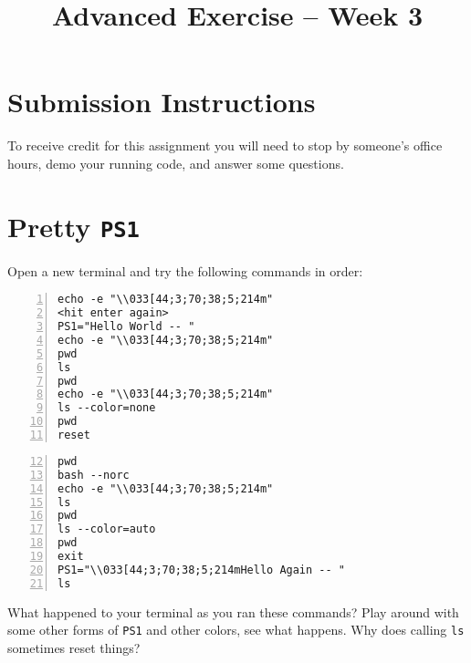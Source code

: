 \documentclass{article}
\begin{document}
\fancyfoot[C]{\color{gray} \thepage~/~\pageref*{LastPage}}
\pagestyle{fancyplain}


\title{\textbf{Advanced Exercise -- Week 3\\}}
\author{\textbf{\color{red}{Due: Before October 8, 10:00PM}}}
\date{}
\maketitle

\section*{Submission Instructions}
To receive credit for this assignment you will need to stop by someone's
office hours, demo your running code, and answer some questions.

\section{Pretty \texttt{PS1}}

Open a new terminal and try the following commands in order:

\begin{minipage}[t]{0.5\textwidth}
\begin{lstlisting}[numbers=left]
echo -e "\\033[44;3;70;38;5;214m"
<hit enter again>
PS1="Hello World -- "
echo -e "\\033[44;3;70;38;5;214m"
pwd
ls
pwd
echo -e "\\033[44;3;70;38;5;214m"
ls --color=none
pwd
reset
\end{lstlisting}
\end{minipage}
\begin{minipage}[t]{0.5\textwidth}
  \begin{lstlisting}[numbers=left,firstnumber=12]
pwd
bash --norc
echo -e "\\033[44;3;70;38;5;214m"
ls
pwd
ls --color=auto
pwd
exit
PS1="\\033[44;3;70;38;5;214mHello Again -- "
ls
\end{lstlisting}
\end{minipage}

\noindent
What happened to your terminal as you ran these commands?
Play around with some other forms of \texttt{PS1} and other colors, see what
happens. Why does calling \texttt{ls} sometimes reset things?
\end{document}
